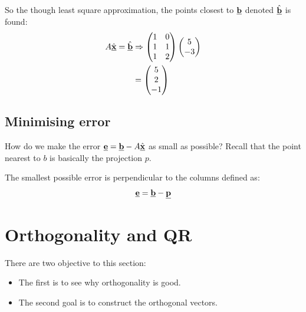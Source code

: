 \documentclass[10pt,a4paper]{article}
\begin{document}
\pagebreak

So the though least square approximation, the points closest to $\textbf{\underline{b}}$ denoted $\hat{\textbf{\underline{b}}}$ is found:
\begin{align*}
    A \hat{\textbf{\underline{x}}} = \hat{\textbf{\underline{b}}} &\Rightarrow \begin{pmatrix}
        1&0 \\
        1&1 \\
        1&2
    \end{pmatrix}\begin{pmatrix}
        5\\-3
    \end{pmatrix} \\
    &= \begin{pmatrix}
        5 \\ 2 \\ -1
    \end{pmatrix}
\end{align*}

\subsection{Minimising error}

How do we make the error $\textbf{\underline{e}} = \textbf{\underline{b}} - A\hat{\textbf{\underline{x}}}$ as small as possible? Recall that the point nearest to $b$ is
basically the projection $p$.

The smallest possible error is perpendicular to the columns defined as:
\begin{align*}
    \textbf{\underline{e}} = \textbf{\underline{b}} - \textbf{\underline{p}}
\end{align*}
 
\pagebreak
\section{Orthogonality and QR}

There are two objective to this section:
\begin{itemize}
    \item The first is to see why orthogonality is good.
    \item The second goal is to construct the orthogonal vectors.
\end{itemize} 
\end{document}
